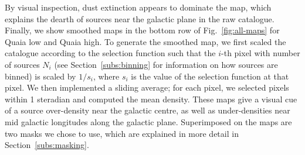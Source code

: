 \documentclass[fleqn,usenatbib]{mnras}
\begin{document}
    By visual inspection, dust extinction appears to dominate the map, which explains the dearth of sources near the galactic plane in the raw catalogue.
    Finally, we show smoothed maps in the bottom row of Fig.~\ref{fig:all-maps} for Quaia low and Quaia high.
    To generate the smoothed map, we first scaled the catalogue according to the selection function such that the $i$-th pixel with number of sources $N_i$ (see Section~\ref{subs:binning} for information on how sources are binned) is scaled by $1 / s_i$, where $s_i$ is the value of the selection function at that pixel.
    We then implemented a sliding average; for each pixel, we selected pixels within 1 steradian and computed the mean density.
    These maps give a visual cue of a source over-density near the galactic centre, as well as under-densities near mid galactic longitudes along the galactic plane.
    Superimposed on the maps are two masks we chose to use, which are explained in more detail in Section~\ref{subs:masking}.
    
\end{document}
